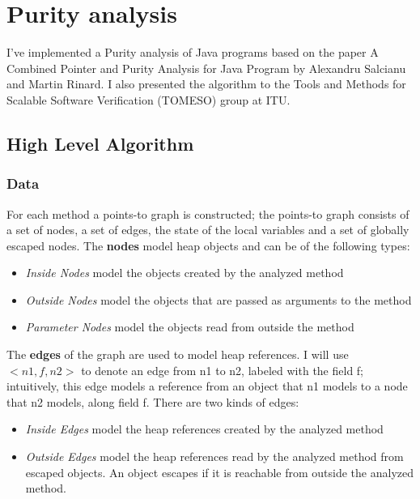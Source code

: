 \documentclass[11pt]{exam}
\begin{document}
\newpage

\section{Purity analysis}

I've implemented a Purity analysis of Java programs based on the paper
A Combined Pointer and Purity Analysis for Java Program by Alexandru
Salcianu and Martin Rinard. I also presented the algorithm to the
Tools and Methods for Scalable Software Verification (TOMESO) group at
ITU.

\subsection{High Level Algorithm}

\subsubsection*{Data}

For each method a points-to graph is constructed; the points-to graph
consists of a set of nodes, a set of edges, the state of the local
variables and a set of globally escaped nodes. The \textbf{nodes}
model heap objects and can be of the following types:

\begin{itemize}
  \setlength{\itemsep}{1pt}
  \setlength{\parskip}{0pt}
  \item \emph{Inside Nodes} model the objects created by the analyzed method
  \item \emph{Outside Nodes} model the objects that are passed as arguments
        to the method
  \item \emph{Parameter Nodes} model the objects read from outside the method
\end{itemize}

The \textbf{edges} of the graph are used to model heap references. I will use
$<n1,f,n2>$ to denote an edge from n1 to n2, labeled with the field f;
intuitively, this edge models a reference from an object that n1
models to a node that n2 models, along field f. There are two kinds of
edges:

\begin{itemize}
  \setlength{\itemsep}{1pt}
  \setlength{\parskip}{0pt}
  \item \emph{Inside Edges} model the heap references created by the analyzed
        method
  \item \emph{Outside Edges} model the heap references read by the analyzed
        method from escaped objects. An object escapes if it is reachable
        from outside the analyzed method.
\end{itemize}
\end{document}
